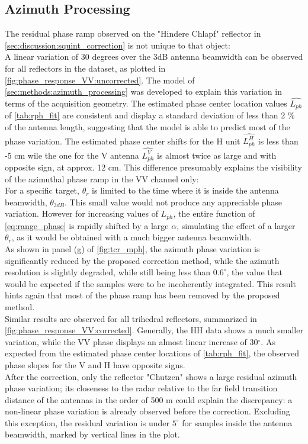 \subsection{Azimuth Processing}\label{sec:discussion:azimuth_processing}
The residual phase ramp observed on the "Hindere Chlapf" reflector in \autoref{sec:discussion:squint_correction} is not unique to that object:\\ A linear variation of 30 degrees over the 3dB antenna beamwidth can be observed for all reflectors in the dataset, as plotted in \autoref{fig:phase_response_VV:uncorrected}.  The model of \autoref{sec:methods:azimuth_processing} was developed to explain this variation in terms of the acquisition geometry.
The estimated phase center location values $\hat{L_{ph}}$ of \autoref{tab:rph_fit} are consistent and display a standard deviation of less than 2 \% of the antenna length, suggesting that the model is able to predict most of the phase variation. The estimated phase center shifts for the H unit $\hat{L_{ph}^{H}}$ is less than -5 cm wile the one for the V antenna $\hat{L_{ph}^{V}}$ is almost twice as large and with opposite sign, at approx. 12 cm. This difference presumably explains the visibility of the azimuthal phase ramp in the VV channel only:\\
For a specific target,  $\theta_r$ is limited to the time where it is inside the antenna beamwidth, $\theta_{3dB}$. This small value would not produce any appreciable phase variation. However for increasing values of $L_{ph}$, the entire function of \autoref{eq:range_phase} is rapidly shifted  by a large $\alpha$, simulating the effect of a larger $\theta_r$, as it would be obtained with a much bigger antenna beamwidth.\\
As shown in panel (g) of \autoref{fig:tcr_mph}, the azimuth phase variation is significantly reduced by the proposed correction method, while the azimuth resolution is slightly degraded, while still being less than $0.6^\circ$, the value that would be expected if the samples were to be incoherently integrated. This result hints again that most of the phase ramp has been removed by the proposed method.\\
Similar results are observed for all trihedral reflectors, summarized in \autoref{fig:phase_response_VV:corrected}.  Generally, the HH data shows a much smaller variation, while the VV phase displays an almost linear increase of 30$^\circ$. As expected from the estimated phase center locations of \autoref{tab:rph_fit}, the observed phase slopes for the V and H have opposite signs.\\  After the correction, only the reflector "Chutzen" shows a large residual azimuth phase variation; its closeness to the radar relative to the far field transition distance of the antennas in the order of 500 m could explain the discrepancy: a non-linear  phase variation is already observed before the correction. Excluding this exception, the residual variation is under $5^\circ$ for samples inside the antenna beamwidth, marked by vertical lines in the plot.
